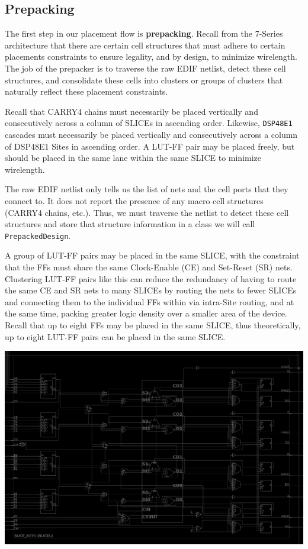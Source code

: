 \begin{multicols}{2}

\subsection{Prepacking}
\label{subsec:prepacking}


The first step in our placement flow is \textbf{prepacking}. 
Recall from the 7-Series architecture that there are certain cell structures that must adhere to certain placements constraints to ensure legality, and by design, to minimize wirelength. 
The job of the prepacker is to traverse the raw EDIF netlist, detect these cell structures, and consolidate these cells into clusters or groups of clusters that naturally reflect these placement constraints. 

Recall that CARRY4 chains must necessarily be placed vertically and consecutively across a column of SLICEs in ascending order. 
Likewise, \texttt{DSP48E1} cascades must necessarily be placed vertically and consecutively across a column of DSP48E1 Sites in ascending order. 
A LUT-FF pair may be placed freely, but should be placed in the same lane within the same SLICE to minimize wirelength.

The raw EDIF netlist only tells us the list of nets and the cell ports that they connect to. 
It does not report the presence of any macro cell structures (CARRY4 chains, etc.). 
Thus, we must traverse the netlist to detect these cell structures and store that structure information in a class we will call \texttt{PrepackedDesign}.

A group of LUT-FF pairs may be placed in the same SLICE, with the constraint that the FFs must share the same Clock-Enable (CE) and Set-Reset (SR) nets.
Clustering LUT-FF pairs like this can reduce the redundancy of having to route the same CE and SR nets to many SLICEs by routing the nets to fewer SLICEs and connecting them to the individual FFs within via intra-Site routing, and at the same time, packing greater logic density over a smaller area of the device. 
Recall that up to eight FFs may be placed in the same SLICE, thus theoretically, up to eight LUT-FF pairs can be placed in the same SLICE. 


{
    \centering
    \includegraphics[width=\columnwidth]{figures/slicel.png}
    \label{fig:slicel}
}



\end{multicols}
